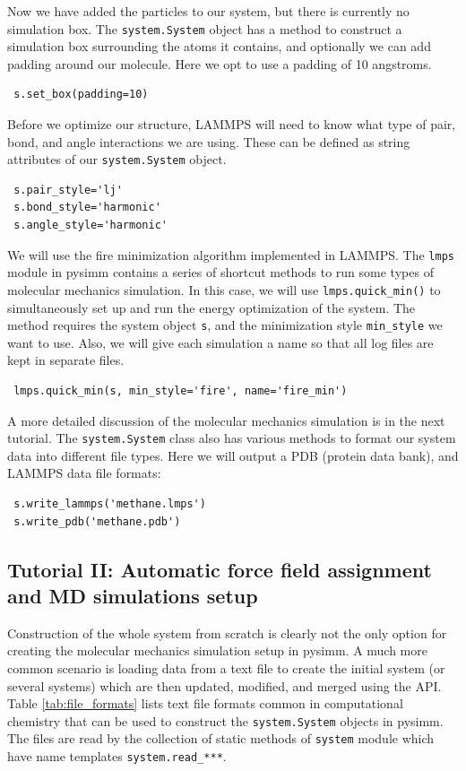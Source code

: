 \documentclass[9pt,tutorial]{livecoms}
\begin{document}
Now we have added the particles to our system, but there is currently no simulation box. The \lstinline$system.System$ object has a method to construct a simulation box surrounding the atoms it contains, and optionally we can add padding around our molecule. Here we opt to use a padding of 10 angstroms.

\begin{lstlisting}
 s.set_box(padding=10)
\end{lstlisting}
Before we optimize our structure, LAMMPS will need to know what type of pair, bond, and angle interactions we are using. These can be defined as string attributes of our \lstinline$system.System$ object.

\begin{lstlisting}
 s.pair_style='lj'
 s.bond_style='harmonic'
 s.angle_style='harmonic'
\end{lstlisting}

We will use the fire minimization algorithm implemented in LAMMPS. The \lstinline$lmps$ module in pysimm contains a series of shortcut methods to run some types of molecular mechanics simulation. In this case, we will use \lstinline$lmps.quick_min()$ to simultaneously set up and run the energy optimization of the system. The method requires the system object \lstinline$s$, and the minimization style \lstinline$min_style$ we want to use. Also, we will give each simulation a name so that all log files are kept in separate files.

\begin{lstlisting}
 lmps.quick_min(s, min_style='fire', name='fire_min')
\end{lstlisting}
A more detailed discussion of the molecular mechanics simulation is in the next tutorial. The \lstinline$system.System$ class also has various methods to format our system data into different file types. Here we will output a PDB (protein data bank), and LAMMPS data file formats:
\begin{lstlisting}
 s.write_lammps('methane.lmps')
 s.write_pdb('methane.pdb')
\end{lstlisting}


\subsection{Tutorial II: Automatic force field assignment and MD simulations setup}

Construction of the whole system from scratch is clearly not the only option for creating the molecular mechanics simulation setup in pysimm. A much more common scenario is loading data from a text file to create the initial system (or several systems) which are then updated, modified, and merged using the API. Table \ref{tab:file_formats} lists text file formats common in computational chemistry that can be used to construct the \lstinline$system.System$ objects in pysimm. The files are read by the collection of static methods of \lstinline$system$ module which have name templates \lstinline$system.read_***$.     
\end{document}
